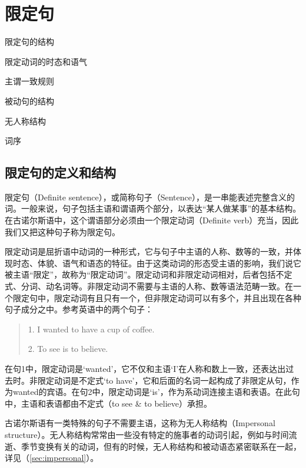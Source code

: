 \chapter{限定句}
\begin{introduction}[章节要点]
    \item 限定句的结构
    \item 限定动词的时态和语气
    \item 主谓一致规则
    \item 被动句的结构
    \item 无人称结构
    \item 词序
\end{introduction}

\section{限定句的定义和结构}
限定句（Definite sentence），或简称句子（Sentence），是一串能表述完整含义的词。一般来说，句子包括主语和谓语两个部分，以表达“某人做某事”的基本结构。在古诺尔斯语中，这个谓语部分必须由一个限定动词（Definite verb）充当，因此我们又把这种句子称为限定句。

限定动词是屈折语中动词的一种形式，它与句子中主语的人称、数等的一致，并体现时态、体貌、语气和语态的特征。由于这类动词的形态受主语的影响，我们说它被主语“限定”，故称为“限定动词”。限定动词和非限定动词相对，后者包括不定式、分词、动名词等。非限定动词不需要与主语的人称、数等语法范畴一致。在一个限定句中，限定动词有且只有一个，但非限定动词可以有多个，并且出现在各种句子成分之中。参考英语中的两个句子：
\begin{quote}
    1. I wanted to have a cup of coffee.

    2. To see is to believe.
\end{quote}

在句1中，限定动词是`wanted'，它不仅和主语`I'在人称和数上一致，还表达出过去时。非限定动词是不定式`to have'，它和后面的名词一起构成了非限定从句，作为wanted的宾语。在句2中，限定动词是`is'，作为系动词连接主语和表语。在此句中，主语和表语都由不定式（to see \& to believe）承担。


古诺尔斯语有一类特殊的句子不需要主语，这称为无人称结构（Impersonal structure）。无人称结构常常由一些没有特定的施事者的动词引起，例如与时间流逝、季节变换有关的动词，但有的时候，无人称结构和被动语态紧密联系在一起，详见（\ref{sec:impersonal}）。

